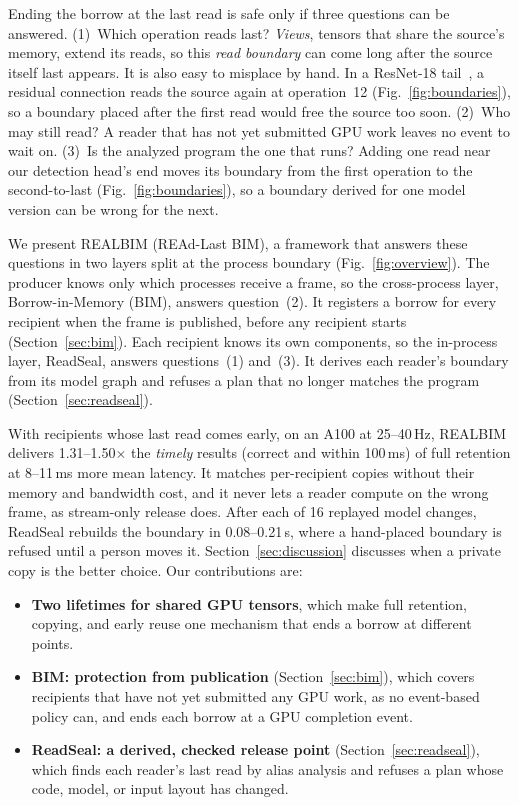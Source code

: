 \documentclass[conference]{IEEEtran}
\newcommand{\sys}{REALBIM}
\newcommand{\ms}{\,ms}
\newcommand{\Hz}{\,Hz}
\begin{document}
Ending the borrow at the last read is safe only if three questions can be answered. (1)~Which operation reads last? \emph{Views}, tensors that share the source's memory, extend its reads, so this \emph{read boundary} can come long after the source itself last appears. It is also easy to misplace by hand. In a ResNet-18 tail~\cite{resnet}, a residual connection reads the source again at operation~12 (Fig.~\ref{fig:boundaries}), so a boundary placed after the first read would free the source too soon. (2)~Who may still read? A reader that has not yet submitted GPU work leaves no event to wait on. (3)~Is the analyzed program the one that runs? Adding one read near our detection head's end moves its boundary from the first operation to the second-to-last (Fig.~\ref{fig:boundaries}), so a boundary derived for one model version can be wrong for the next.

We present \sys{} (REAd-Last BIM), a framework that answers these questions in two layers split at the process boundary (Fig.~\ref{fig:overview}). The producer knows only which processes receive a frame, so the cross-process layer, Borrow-in-Memory (BIM), answers question~(2). It registers a borrow for every recipient when the frame is published, before any recipient starts (Section~\ref{sec:bim}). Each recipient knows its own components, so the in-process layer, ReadSeal, answers questions~(1) and~(3). It derives each reader's boundary from its model graph and refuses a plan that no longer matches the program (Section~\ref{sec:readseal}).

With recipients whose last read comes early, on an A100 at 25--40\Hz, \sys{} delivers 1.31--1.50$\times$ the \emph{timely} results (correct and within 100\ms) of full retention at 8--11\ms{} more mean latency. It matches per-recipient copies without their memory and bandwidth cost, and it never lets a reader compute on the wrong frame, as stream-only release does. After each of 16 replayed model changes, ReadSeal rebuilds the boundary in 0.08--0.21\,s, where a hand-placed boundary is refused until a person moves it. Section~\ref{sec:discussion} discusses when a private copy is the better choice. Our contributions are:
\begin{itemize}
\item \textbf{Two lifetimes for shared GPU tensors}, which make full retention, copying, and early reuse one mechanism that ends a borrow at different points.
\item \textbf{BIM: protection from publication} (Section~\ref{sec:bim}), which covers recipients that have not yet submitted any GPU work, as no event-based policy can, and ends each borrow at a GPU completion event.
\item \textbf{ReadSeal: a derived, checked release point} (Section~\ref{sec:readseal}), which finds each reader's last read by alias analysis and refuses a plan whose code, model, or input layout has changed.
\end{itemize}
\end{document}
